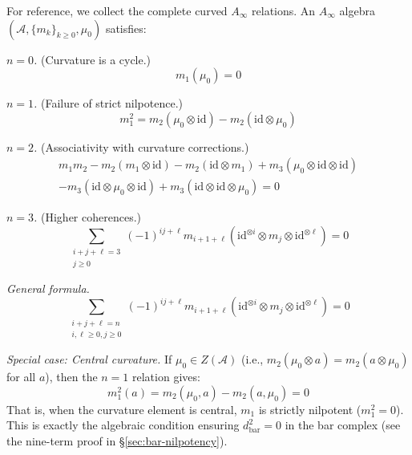 For reference, we collect the complete curved $A_\infty$ relations. An $A_\infty$ algebra
$(\mathcal{A}, \{m_k\}_{k \geq 0}, \mu_0)$ satisfies:

\emph{$n = 0$.} (Curvature is a cycle.)
\[m_1(\mu_0) = 0\]

\emph{$n = 1$.} (Failure of strict nilpotence.)
\[m_1^2 = m_2(\mu_0 \otimes \text{id}) - m_2(\text{id} \otimes \mu_0)\]

\emph{$n = 2$.} (Associativity with curvature corrections.)
\begin{multline}
m_1 m_2 - m_2(m_1 \otimes \text{id}) - m_2(\text{id} \otimes m_1) + m_3(\mu_0 \otimes \text{id}
\otimes \text{id}) \\
- m_3(\text{id} \otimes \mu_0 \otimes \text{id}) + m_3(\text{id} \otimes \text{id} \otimes \mu_0) = 0
\end{multline}

\emph{$n = 3$.} (Higher coherences.)
\[\sum_{\substack{i+j+\ell = 3 \\ j \geq 0}} (-1)^{ij+\ell} m_{i+1+\ell}(\text{id}^{\otimes i}
\otimes m_j \otimes \text{id}^{\otimes \ell}) = 0\]

\emph{General formula.}
\[\sum_{\substack{i+j+\ell=n \\ i,\ell \geq 0, j \geq 0}} (-1)^{ij+\ell} m_{i+1+\ell}
(\text{id}^{\otimes i} \otimes m_j \otimes \text{id}^{\otimes \ell}) = 0\]

\emph{Special case: Central curvature.}
If $\mu_0 \in Z(\mathcal{A})$ (i.e., $m_2(\mu_0 \otimes a) = m_2(a \otimes \mu_0)$ for all $a$), then the $n=1$ relation gives:
\[m_1^2(a) = m_2(\mu_0, a) - m_2(a, \mu_0) = 0\]
That is, when the curvature element is central, $m_1$ is strictly nilpotent ($m_1^2 = 0$). This is exactly the algebraic condition ensuring $d_{\text{bar}}^2 = 0$ in the bar complex (see the nine-term proof in \S\ref{sec:bar-nilpotency}).
